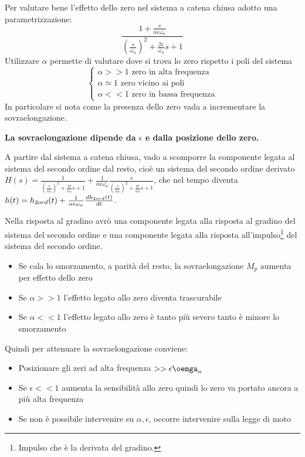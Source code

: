 Per valutare bene l'effetto dello zero nel sistema a catena chiusa adotto una parametrizzazione:
\[\frac{1+\frac{s}{\alpha \epsilon \omega_n}}{\left(\frac{s}{\omega_n}\right)^2+\frac{2\epsilon}{\omega_n}s+1}\]
Utilizzare \(\alpha\) permette di valutare dove si trova lo zero rispetto i poli del sistema
\[
\begin{cases}
\alpha >> 1 \text{ \ zero in alta frequenza} \\
\alpha \simeq 1 \text{ \ zero vicino ai poli} \\
\alpha << 1 \text{ \ zero in bassa frequenza}
\end{cases}
\]
In particolare si nota come la presenza dello zero vada a incrementare la sovraelongazione.

\textbf{La sovraelongazione dipende da \(\epsilon\) e dalla posizione dello zero.}


A partire dal sistema a catena chiusa, vado a scomporre la componente legata al sistema del secondo ordine dal resto, cioè un sistema del secondo ordine derivato \(H(s)=\frac{1}{\left(\frac{s}{\omega_n}\right)^2+\frac{2\epsilon}{\omega_n}s+1} + \frac{1}{\alpha \epsilon \omega_n}\frac{s}{\left(\frac{s}{\omega_n}\right)^2+\frac{2\epsilon}{\omega_n}s+1}\), che nel tempo diventa \(h(t)=h_{2 ord}(t) + \frac{1}{\alpha \epsilon \omega_n} \frac{dh_{2 ord}(t)}{dt}\).

Nella risposta al gradino avrò una componente legata alla risposta al gradino del sistema del secondo ordine e una componente legata alla risposta all'impulso\footnote{Impulso che è la derivata del gradino.} del sistema del secondo ordine.
\begin{itemize}
    \item Se cala lo smorzamento, a parità del resto, la sovraelongazione \(M_p\) aumenta per effetto dello zero
    \item Se \(\alpha >>1\) l'effetto legato allo zero diventa trascurabile
    \item Se \(\alpha <<1\) l'effetto legato allo zero è tanto più severo tanto è minore lo smorzamento
\end{itemize}

Quindi per attenuare la sovraelongazione conviene:
\begin{itemize}
    \item Posizionare gli zeri ad alta frequenza \(>> \epsilon \oemga_n\)
    \item Se \(\epsilon << 1\) aumenta la sensibilità allo zero quindi lo zero va portato ancora  a più alta frequenza
    \item Se non è possibile intervenire su \(\alpha, \epsilon\), occorre intervenire sulla legge di moto
\end{itemize}

